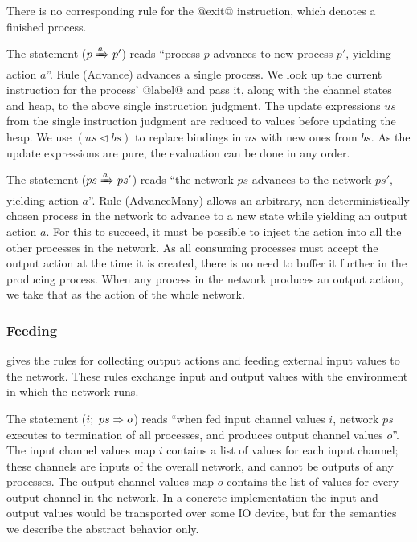 There is no corresponding rule for the @exit@ instruction, which denotes a finished process.

The statement ($p \xRightarrow{a} p'$) reads ``process $p$ advances to new process $p'$, yielding action $a$''. Rule (Advance) advances a single process. We look up the current instruction for the process' @label@ and pass it, along with the channel states and heap, to the above single instruction judgment. The update expressions $us$ from the single instruction judgment are reduced to values before updating the heap. We use $(us \lhd bs)$ to replace bindings in $us$ with new ones from $bs$. As the update expressions are pure, the evaluation can be done in any order.

The statement ($ps \xRightarrow{a} ps'$) reads ``the network $ps$ advances to the network $ps'$, yielding action $a$''.
Rule (AdvanceMany) allows an arbitrary, non-deterministically chosen process in the network to advance to a new state while yielding an output action $a$.
For this to succeed, it must be possible to inject the action into all the other processes in the network.
As all consuming processes must accept the output action at the time it is created, there is no need to buffer it further in the producing process.
When any process in the network produces an output action, we take that as the action of the whole network.



\subsubsection{Feeding}
 gives the rules for collecting output actions and feeding external input values to the network.
These rules exchange input and output values with the environment in which the network runs.

The statement ($i;~ps \Rightarrow o$) reads ``when fed input channel values $i$, network $ps$ executes to termination of all processes, and produces output channel values $o$''.
The input channel values map $i$ contains a list of values for each input channel; these channels are inputs of the overall network, and cannot be outputs of any processes.
The output channel values map $o$ contains the list of values for every output channel in the network.
In a concrete implementation the input and output values would be transported over some IO device, but for the semantics we describe the abstract behavior only.

